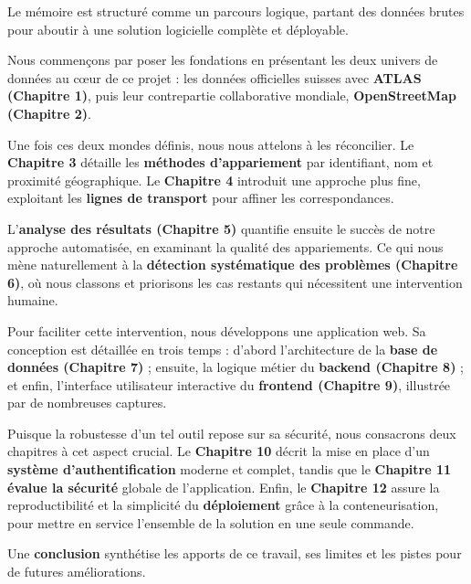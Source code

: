Le mémoire est structuré comme un parcours logique, partant des données brutes pour aboutir à une solution logicielle complète et déployable. 

Nous commençons par poser les fondations en présentant les deux univers de données au cœur de ce projet : les données officielles suisses avec \textbf{ATLAS (Chapitre 1)}, puis leur contrepartie collaborative mondiale, \textbf{OpenStreetMap (Chapitre 2)}.

Une fois ces deux mondes définis, nous nous attelons à les réconcilier. Le \textbf{Chapitre 3} détaille les \textbf{méthodes d'appariement} par identifiant, nom et proximité géographique. Le \textbf{Chapitre 4} introduit une approche plus fine, exploitant les \textbf{lignes de transport} pour affiner les correspondances.

L'\textbf{analyse des résultats (Chapitre 5)} quantifie ensuite le succès de notre approche automatisée, en examinant la qualité des appariements. Ce qui nous mène naturellement à la \textbf{détection systématique des problèmes (Chapitre 6)}, où nous classons et priorisons les cas restants qui nécessitent une intervention humaine.

Pour faciliter cette intervention, nous développons une application web. Sa conception est détaillée en trois temps : d'abord l'architecture de la \textbf{base de données (Chapitre 7)} ; ensuite, la logique métier du \textbf{backend (Chapitre 8)} ; et enfin, l'interface utilisateur interactive du \textbf{frontend (Chapitre 9)}, illustrée par de nombreuses captures.

Puisque la robustesse d’un tel outil repose sur sa sécurité, nous consacrons deux chapitres à cet aspect crucial. Le \textbf{Chapitre 10} décrit la mise en place d'un \textbf{système d'authentification} moderne et complet, tandis que le \textbf{Chapitre 11} \textbf{évalue la sécurité} globale de l’application.
Enfin, le \textbf{Chapitre 12} assure la reproductibilité et la simplicité du \textbf{déploiement} grâce à la conteneurisation, pour mettre en service l'ensemble de la solution en une seule commande.

Une \textbf{conclusion} synthétise les apports de ce travail, ses limites et les pistes pour de futures améliorations.
